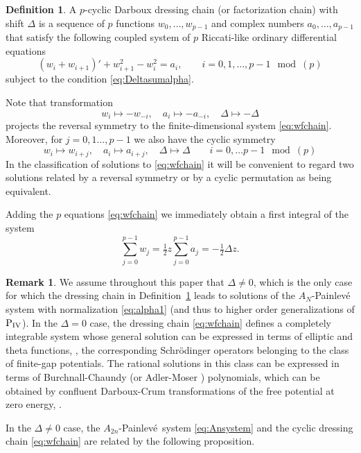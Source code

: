 \documentclass[10pt]{amsart}
\theoremstyle{definition}
\newtheorem{definition}[thm]{Definition}
\newtheorem{remark}[thm]{Remark}
\numberwithin{equation}{section}
\numberwithin{figure}{section}
\newcommand{\Pfour}{{\rm P_{IV}}}
\newcommand{\p}{Painlev\'{e}}
\newcommand{\odes}{ordinary differential equations}
\begin{document}
\begin{definition}\label{def:wchain}
  A $p$-cyclic Darboux dressing chain (or factorization chain) with
  shift $\Delta$ is a sequence of $p$ functions $w_0,\ldots, w_{p-1}$
  and complex numbers $a_0,\ldots, a_{p-1}$ that satisfy
  the following coupled system of $p$ Riccati-like \odes\
\begin{equation}
  \label{eq:wfchain}
  (w_i + w_{i+1})' + w_{i+1}^2 - w_i^2 = a_i ,\qquad
  i=0,1,\ldots, p-1 \mod(p)  
\end{equation}
subject to the condition \eqref{eq:Deltasumalpha}.
\end{definition}
Note that
transformation 
\begin{equation}
  \label{eq:reversal2}
  w_i \mapsto -w_{-i},\quad a_i \mapsto -a_{-i},\quad
  \Delta\mapsto -\Delta
\end{equation}
projects the reversal symmetry to the finite-dimensional system
\eqref{eq:wfchain}.  Moreover, for $j=0,1\ldots, p-1$ we also have the
cyclic symmetry
\[ w_i \mapsto w_{i + j},\quad a_i \mapsto a_{i+j},\quad
\Delta \mapsto \Delta \qquad i=0,\ldots p-1 \mod(p) \]
In the classification of solutions to \eqref{eq:wfchain} it will be
convenient to regard two solutions related by a reversal symmetry or
by a cyclic permutation as being equivalent.


Adding the $p$ equations \eqref{eq:wfchain} we immediately obtain a
first integral of the system
\[ \sum_{j=0}^{p-1} w_j= \tfrac12z\sum_{j=0}^{p-1} a_j=
-\tfrac12{\Delta}z.\]

\begin{remark}
We assume throughout this paper that $\Delta\neq0$, which is the only case for which the dressing chain in Definition~\ref{def:wchain} leads to solutions of the $A_N$-Painlev\'e system with normalization \eqref{eq:alpha1} (and thus to higher order generalizations of $\Pfour$). In the $\Delta=0$ case, the dressing chain \eqref{eq:wfchain} defines a completely integrable system whose general solution can be expressed in terms of elliptic and theta functions, \cite{veselov1993dressing}, the corresponding Schr\"odinger operators belonging to the class of finite-gap potentials. The  rational solutions in this class can be expressed in terms of Burchnall-Chaundy \cite{burchnall1930set} (or Adler-Moser \cite{adler1978class})  polynomials, which can be obtained by confluent Darboux-Crum transformations of the free potential at zero energy, \cite{refDG86}.
\end{remark}
In the $\Delta\neq0$ case,  the $A_{2n}$-\p\ system \eqref{eq:Ansystem} and the cyclic dressing chain \eqref{eq:wfchain} are related by the following proposition.
\end{document}

